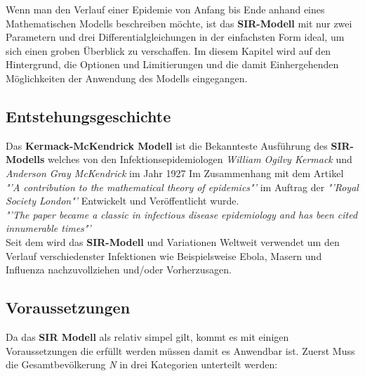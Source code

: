 \documentclass[12pt]{scrartcl} %
\begin{document}
Wenn man den Verlauf einer Epidemie von Anfang bis Ende anhand eines Mathematischen Modells beschreiben möchte, ist das \textbf{SIR-Modell} 
mit nur zwei Parametern und drei Differentialgleichungen in der einfachsten Form ideal, um sich einen groben Überblick zu verschaffen. \cite[vgl.]{4}
Im diesem Kapitel wird auf den Hintergrund, die Optionen und Limitierungen und die damit Einhergehenden Möglichkeiten der Anwendung des Modells eingegangen.

\subsection{Entstehungsgeschichte}

Das \textbf{Kermack-McKendrick Modell} ist die Bekannteste Ausführung des \textbf{SIR-Modells} welches von den Infektionsepidemiologen \textsl{William Ogilvy Kermack} und \textsl{Anderson Gray McKendrick} im Jahr 1927 Im Zusammenhang mit dem Artikel 
\textsl{"'A contribution to the mathematical theory of epidemics"'} \cite{7}
im Auftrag der \textsl{"'Royal Society London"'} \cite[s. 1]{6} Entwickelt und Veröffentlicht wurde. \cite[vgl.]{6} \\

\textsl{"'The paper became a classic in infectious disease epidemiology and has been cited innumerable times"'} \cite[s. 1]{6} \\

Seit dem wird das \textbf{SIR-Modell} und Variationen Weltweit verwendet um den Verlauf verschiedenster Infektionen
wie Beispielsweise Ebola, Masern und Influenza nachzuvollziehen und/oder Vorherzusagen. \cite[vgl. s. 3]{3}



\subsection{Voraussetzungen}

Da das \textbf{SIR Modell} als relativ simpel gilt, kommt es mit einigen Voraussetzungen die erfüllt werden müssen damit es Anwendbar ist.
Zuerst Muss die Gesamtbevölkerung \textit{N} in drei Kategorien unterteilt werden:
\end{document}
